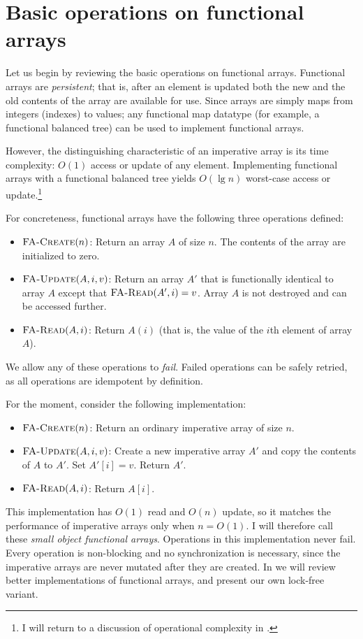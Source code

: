 \section{Basic operations on functional arrays}
Let us begin by reviewing the basic operations on functional arrays.
Functional arrays are \emph{persistent}; that is,
after an element is updated both the new and the old contents of the
array are available for use.  Since arrays are simply maps from
integers (indexes) to values; any functional map datatype (for
example, a functional balanced tree) can be used to implement
functional arrays.

However, the distinguishing characteristic of an imperative array is its
time complexity: $O(1)$ access or update of any element.
Implementing functional arrays with a functional balanced tree yields
$O(\lg n)$ worst-case access or update.\footnote{I will return to
a discussion of operational complexity in .}

For concreteness, functional arrays have the following three
operations defined:
\begin{itemize}
\item $\text{\sc FA-Create}(n)$: Return an array $A$ of size $n$.  The
  contents of the array are initialized to zero.
\item $\text{\sc FA-Update}(A, i, v)$: Return an array $A'$ that is
  functionally identical to array $A$ except that
  $\text{\sc FA-Read}(A', i)=v$.
  Array $A$ is not destroyed and can be accessed further.
\item $\text{\sc FA-Read}(A, i)$: Return $A(i)$ (that is, the
  value of the $i$th element of array $A$).
\end{itemize}
We allow any of these operations to \emph{fail}.  Failed operations
can be safely retried, as all operations are idempotent by definition.

For the moment, consider the following \naive implementation:
\begin{itemize}
\item $\text{\sc FA-Create}(n)$: Return an ordinary imperative array of size
  $n$.
\item $\text{\sc FA-Update}(A, i, v)$: Create a new imperative array
  $A'$ and copy the contents of $A$ to $A'$.  Set $A'[i]=v$. Return $A'$.
\item $\text{\sc FA-Read}(A, i)$: Return $A[i]$.
\end{itemize}
This implementation has $O(1)$ read and $O(n)$ update, so it matches
the performance of imperative arrays only when $n=O(1)$.  I will
therefore call these \emph{small object functional arrays}.  Operations
in this implementation never fail.  Every operation is non-blocking
and no synchronization is necessary, since the imperative arrays are
never mutated after they are created.   In  we will
review better implementations of functional arrays, and present our
own lock-free variant.

